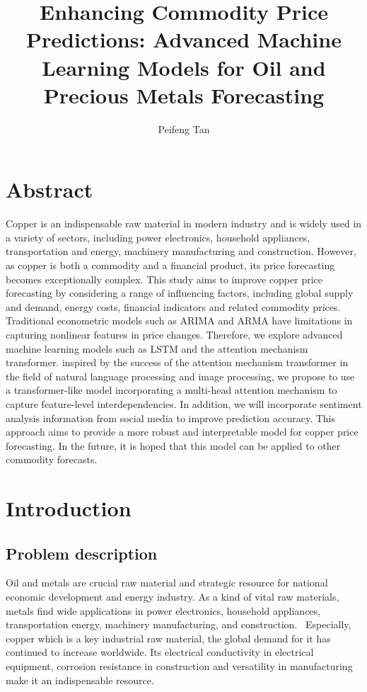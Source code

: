\documentclass[project-plan]{report-template}
\title{Enhancing Commodity Price Predictions: Advanced Machine Learning Models for Oil and Precious Metals Forecasting}
\author{Peifeng Tan}
\begin{document}
\maketitlepage  %

\section*{Abstract}
Copper is an indispensable raw material in modern industry and is widely used in a variety of sectors, including power electronics, household appliances, transportation and energy, machinery manufacturing and construction. However, as copper is both a commodity and a financial product, its price forecasting becomes exceptionally complex. This study aims to improve copper price forecasting by considering a range of influencing factors, including global supply and demand, energy costs, financial indicators and related commodity prices. Traditional econometric models such as ARIMA and ARMA have limitations in capturing nonlinear features in price changes. Therefore, we explore advanced machine learning models such as LSTM and the attention mechanism transformer. inspired by the success of the attention mechanism transformer in the field of natural language processing and image processing, we propose to use a transformer-like model incorporating a multi-head attention mechanism to capture feature-level interdependencies. In addition, we will incorporate sentiment analysis information from social media to improve prediction accuracy. This approach aims to provide a more robust and interpretable model for copper price forecasting. In the future, it is hoped that this model can be applied to other commodity forecasts.
\section{Introduction}
\subsection{Problem description}
Oil and metals are crucial raw material and strategic resource for national economic development and energy industry. As a kind of vital raw materials, metals find wide applications in power electronics, household appliances, transportation energy, machinery manufacturing, and construction.~\cite{zhong2019time, qu2019unfolding, han2022r} Especially, copper which is a key industrial raw material, the global demand for it has continued to increase worldwide. Its electrical conductivity in electrical equipment, corrosion resistance in construction and versatility in manufacturing make it an indispensable resource.
\end{document}

